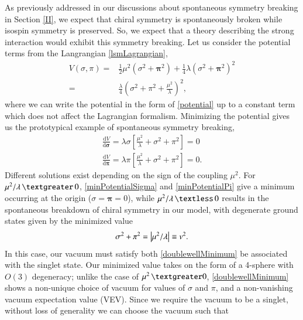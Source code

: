 \documentclass[aps,prd,onecolumn,showpacs,amsmath,amssymb,nofootinbib]{revtex4} \pdfoutput=1
\begin{document}
  As previously addressed in our discussions about spontaneous symmetry breaking in Section \ref{II}, we expect that chiral symmetry is spontaneously broken while isospin symmetry is preserved. So, we expect that a theory describing the strong interaction would exhibit this symmetry breaking. Let us consider the potential terms from the Langrangian \eqref{lsmLagrangian},
  \begin{align}
      V(\sigma,\pi) = &\frac{1}{2}\mu^2\left(\sigma^2+\mathbf{\pi}^2\right) + \frac{1}{4}\lambda\left(\sigma^2+\mathbf{\pi}^2\right)^2\\
      = & \frac{\lambda}{4}\left(\sigma^2+\pi^2 + \frac{\mu^2}{\lambda} \right)^2,\label{potential}
  \end{align}
  where we can write the potential in the form of \eqref{potential} up to a constant term which does not affect the Lagrangian formalism. Minimizing the potential gives us the prototypical example of spontaneous symmetry breaking,
  \begin{gather}
      \frac{\mathrm{d}V}{\mathrm{d}\mathbf{\sigma}} = \lambda \sigma \left[ \frac{\mu^2}{\lambda} + \sigma^2 + \pi^2  \right]=0 \label{minPotentialSigma}\\
      \frac{\mathrm{d}V}{\mathrm{d}\mathbf{\pi}}= \lambda \pi \left[ \frac{\mu^2}{\lambda} + \sigma^2 + \pi^2  \right]=0 \label{minPotentialPi}.
  \end{gather}
Different solutions exist depending on the sign of the coupling $\mu^2$. For $\mu^2/\lambda \, \textgreater\, 0$, \eqref{minPotentialSigma} and \eqref{minPotentialPi} give a minimum occurring at the origin ($\sigma = \mathbf{\pi} = 0$), while $\mu^2/\lambda \, \textless\, 0$  results in the spontaneous breakdown of chiral symmetry in our model, with degenerate ground states given by the minimized value 
\begin{equation}
    \sigma^2 + \pi^2 = \abs{\mu^2/\lambda} \equiv v^2.
    \label{doublewellMinimum}
\end{equation}
In this case, our vacuum must satisfy both \eqref{doublewellMinimum} be associated with the singlet state. Our minimized value takes on the form of a 4-sphere with $O(3)$ degeneracy; unlike the case of $\mu^2\,\textgreater0$, \eqref{doublewellMinimum} shows a non-unique choice of vacuum for values of $\sigma$ and $\pi$, and a non-vanishing vacuum expectation value (VEV). Since we require the vacuum to be a singlet, without loss of generality we can choose the vacuum such that
\end{document}
